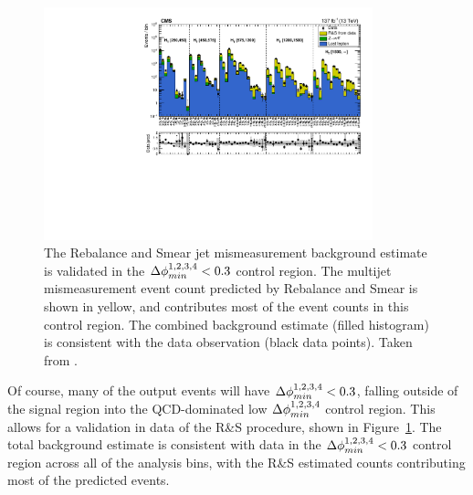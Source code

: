   \begin{figure}[h!]
    \centering
    \includegraphics[width=0.85\textwidth]{figures/MT2_2019/Figure_003.pdf}
    \caption[Validation of the Rebalance and Smear jet mismeasurement background estimate in the $\dphimin < 0.3$ control region.]{
      The Rebalance and Smear jet mismeasurement background estimate is validated in the $\dphimin < 0.3$ control region. 
      The multijet mismeasurement event count predicted by Rebalance and Smear is shown in yellow, and contributes most of the event counts in this control region. 
      The combined background estimate (filled histogram) is consistent with the data observation (black data points).
      Taken from \cite{MT2_2019}.}
    \label{fig:RandSval}
  \end{figure}  

    Of course, many of the output events will have $\dphimin < 0.3$, falling outside of the signal region into the QCD-dominated low $\Delta\phi_{min}^{1,2,3,4}$ control region.
    This allows for a validation in data of the R\&S procedure, shown in Figure~\ref{fig:RandSval}.
    The total background estimate is consistent with data in the $\dphimin < 0.3$ control region across all of the analysis bins, with the R\&S estimated counts contributing most of the predicted events.

